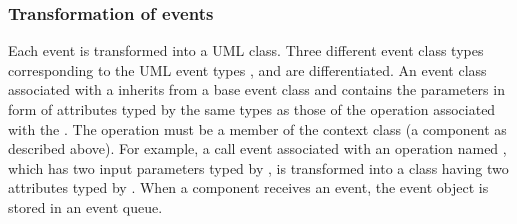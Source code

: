 \subsubsection{Transformation of events}
\label{subsec:events}
Each event is transformed into a UML class. Three different event class types corresponding to the UML event types ,  and  are differentiated. An event class associated with a  inherits from a base event class and contains the parameters in form of attributes typed by the same types as those of the operation associated with the . The operation must be a member of the context class (a component as described above). For example, a call event  associated with an operation named , which has two input parameters typed by , is transformed into a class  having two attributes typed by . When a component receives an event, the event object is stored in an event queue.

